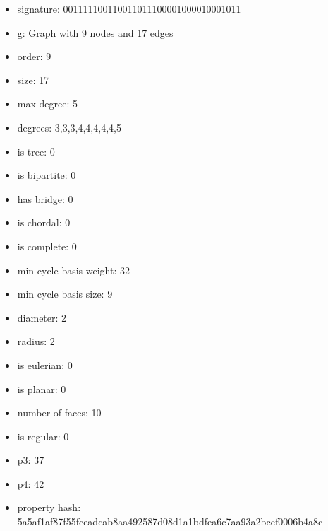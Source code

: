 \newpage
\begin{figure}
\end{figure}
\begin{itemize}
\item signature: 001111100110011011100001000010001011
\item g: Graph with 9 nodes and 17 edges
\item order: 9
\item size: 17
\item max degree: 5
\item degrees: 3,3,3,4,4,4,4,4,5
\item is tree: 0
\item is bipartite: 0
\item has bridge: 0
\item is chordal: 0
\item is complete: 0
\item min cycle basis weight: 32
\item min cycle basis size: 9
\item diameter: 2
\item radius: 2
\item is eulerian: 0
\item is planar: 0
\item number of faces: 10
\item is regular: 0
\item p3: 37
\item p4: 42
\item property hash: 5a5af1af87f55fceadcab8aa492587d08d1a1bdfea6c7aa93a2bcef0006b4a8c
\end{itemize}
